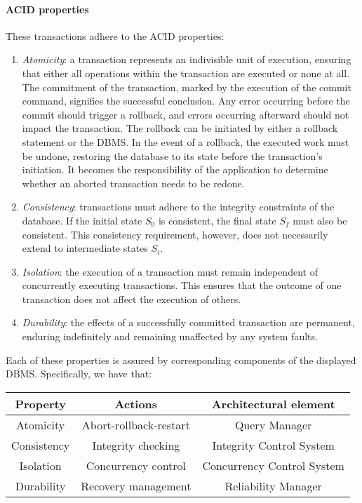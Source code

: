 \paragraph*{ACID properties}
These transactions adhere to the ACID properties:
\begin{enumerate}
    \item \textit{Atomicity}: a transaction represents an indivisible unit of execution, ensuring that either all operations within the transaction are executed or none at all.
        The commitment of the transaction, marked by the execution of the commit command, signifies the successful conclusion. 
        Any error occurring before the commit should trigger a rollback, and errors occurring afterward should not impact the transaction.        
        The rollback can be initiated by either a rollback statement or the DBMS.
        In the event of a rollback, the executed work must be undone, restoring the database to its state before the transaction's initiation.
        It becomes the responsibility of the application to determine whether an aborted transaction needs to be redone.
    \item \textit{Consistency}: transactions must adhere to the integrity constraints of the database.
        If the initial state $S_0$ is consistent, the final state $S_f$ must also be consistent. 
        This consistency requirement, however, does not necessarily extend to intermediate states $S_i$.
    \item \textit{Isolation}: the execution of a transaction must remain independent of concurrently executing transactions. 
        This ensures that the outcome of one transaction does not affect the execution of others.
    \item \textit{Durability}: the effects of a successfully committed transaction are permanent, enduring indefinitely and remaining unaffected by any system faults.
\end{enumerate}
Each of these properties is assured by corresponding components of the displayed DBMS. 
Specifically, we have that:
\begin{table}[H]
    \centering
    \begin{tabular}{c|c|c}
    \textbf{Property} & \textbf{Actions}       & \textbf{Architectural element} \\ \hline
    Atomicity         & Abort-rollback-restart & Query Manager                  \\
    Consistency       & Integrity checking     & Integrity Control System       \\
    Isolation         & Concurrency control    & Concurrency Control System     \\
    Durability        & Recovery management    & Reliability Manager           
    \end{tabular}
\end{table}

